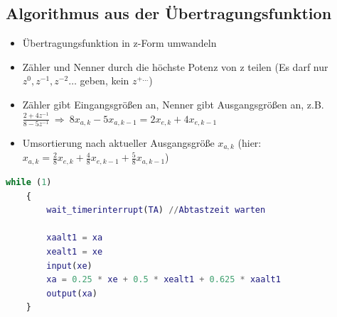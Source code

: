 \subsection{Algorithmus aus der Übertragungsfunktion}
	\begin{itemize}
		\item Übertragungsfunktion in z-Form umwandeln
		\item Zähler und Nenner durch die höchste Potenz von z teilen (Es darf nur \(z^0, z^{-1}, z^{-2} \ldots\) geben, kein \(z^{+\ldots}\))
		\item Zähler gibt Eingangsgrößen an, Nenner gibt Ausgangsgrößen an, z.B. \(\frac{2+4z^{-1}}{8-5z^{-1}} \ \Rightarrow \ 8 x_{a,k} - 5 x_{a,k-1} = 2 x_{e,k} + 4 x_{e,k-1} \) 
		\item Umsortierung nach aktueller Ausgangsgröße \(x_{a,k}\) (hier: \(x_{a,k} = \frac{2}{8} x_{e,k} + \frac{4}{8} x_{e,k-1} + \frac{5}{8} x_{a,k-1}\))
	\end{itemize}

	\begin{lstlisting}[language=Matlab]
	while (1) 
	{
		wait_timerinterrupt(TA) //Abtastzeit warten

		xaalt1 = xa
		xealt1 = xe
		input(xe)
		xa = 0.25 * xe + 0.5 * xealt1 + 0.625 * xaalt1
		output(xa)
	}
	\end{lstlisting}